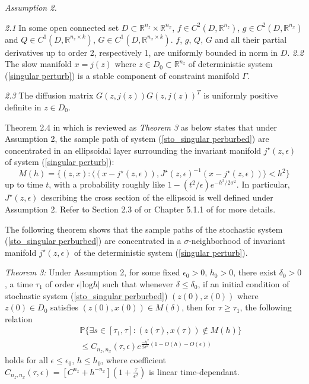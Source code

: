 \documentclass[journal]{IEEEtran}
\newcommand{\ee}{\epsilon}
\begin{document}
\textit{Assumption 2.}

\textit{2.1} In some open connected set $D\subset \mathbb{R}^{n_z}\times\mathbb{R}^{n_x}$, $f\in C^2(D,\mathbb{R}^{n_z})$, $g\in C^2(D,\mathbb{R}^{n_x})$ and $Q\in C^1(D,\mathbb{R}^{n_z\times k})$, $G\in C^1(D,\mathbb{R}^{n_x\times k})$. $f$, $g$, $Q$, $G$ and all their partial derivatives up to order 2, respectively 1, are uniformly bounded in norm in $D$. 
\textit{2.2} The slow manifold $x=j(z)$ where $z\in D_0\subset \mathbb{R}^{n_z}$ of deterministic system (\ref{singular perturb}) is a stable component of constraint manifold $\Gamma$.

\textit{2.3} The diffusion matrix $G(z,j(z))G(z,j(z))^T$ is uniformly positive definite in $z\in D_0$.

Theorem 2.4 in \cite{Gentz:2003} which is reviewed as \textit{Theorem 3} as below states that under Assumption 2, the sample path of system (\ref{sto_singular perburbed}) are concentrated in an ellipsoidal layer surrounding the invariant manifold $j^\star(z,\ee)$ of system (\ref{singular perturb}):
\begin{equation}
M(h)=\{(z,x):\langle (x-j^\star(z,\ee)),J^\star(z,\ee)^{-1}(x-j^\star(z,\ee))\rangle< h^2 \}
\end{equation}
up to time $t$, with a probability roughly like $1-(t^2/\ee)e^{-h^2/2\sigma^2}$. In particular, $J^\star(z,\ee)$ describing the cross section of the ellipsoid is well defined under Assumption 2. Refer to Section 2.3 of \cite{Gentz:2003} or Chapter 5.1.1 of \cite{Gentz:2006} for more details.

The following theorem shows that the sample paths of the stochastic system (\ref{sto_singular perburbed}) are concentrated in a $\sigma$-neighborhood of invariant manifold $j^\star(z,
\ee)$ of the deterministic system (\ref{singular perturb}).



\textit{Theorem 3\cite{Gentz:2003}:} Under Assumption 2, for some fixed $\ee_0>0$, $h_0>0$, there exist $\delta_0>0$, a time $\tau_1$ of order $\ee|\mbox{log}h|$ such that whenever $\delta\leq\delta_0$, if an initial condition of stochastic system (\ref{sto_singular perburbed}) $(z(0),{x}(0))$ where $z(0)\in D_0$ satisfies $(z(0),{x}(0))\in M(\delta)$, then for $\tau\geq\tau_1$, the following relation
\begin{eqnarray}\label{upperbound}
&&\mathbb{P}\{\exists s\in[\tau_1,\tau]:(z(\tau),{x}(\tau))\notin M(h)\}\nonumber\\
&&\leq C_{n_{z},n_x}(\tau,\ee)e^{\frac{-h^2}{2\sigma^2}(1-O(h)-O(\ee))}
\end{eqnarray}
holds for all $\ee\leq\ee_0$, $h\leq h_0$, where coefficient $C_{n_{z},n_x}(\tau,\ee)=[C^{n_{z}}+h^{-n_x}](1+\frac{\tau}{\ee^2})$ is linear time-dependant.
\end{document}
